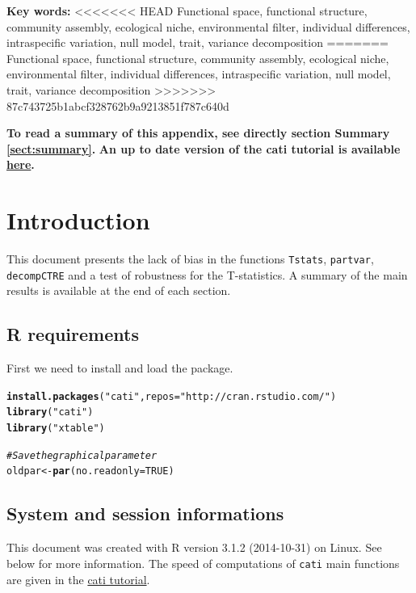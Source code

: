 \documentclass[12pt]{article}\usepackage[]{graphicx}\usepackage[]{color}
\makeatletter
\newcommand{\hlnum}[1]{\textcolor[rgb]{0.686,0.059,0.569}{#1}}%
\newcommand{\hlstr}[1]{\textcolor[rgb]{0.192,0.494,0.8}{#1}}%
\newcommand{\hlcom}[1]{\textcolor[rgb]{0.678,0.584,0.686}{\textit{#1}}}%
\newcommand{\hlstd}[1]{\textcolor[rgb]{0.345,0.345,0.345}{#1}}%
\newcommand{\hlkwb}[1]{\textcolor[rgb]{0.69,0.353,0.396}{#1}}%
\newcommand{\hlkwc}[1]{\textcolor[rgb]{0.333,0.667,0.333}{#1}}%
\newcommand{\hlkwd}[1]{\textcolor[rgb]{0.737,0.353,0.396}{\textbf{#1}}}%
\newenvironment{kframe}{%
 \def\at@end@of@kframe{}%
 \ifinner\ifhmode%
  \def\at@end@of@kframe{\end{minipage}}%
  \begin{minipage}{\columnwidth}%
 \fi\fi%
 \def\FrameCommand##1{\hskip\@totalleftmargin \hskip-\fboxsep
 \colorbox{shadecolor}{##1}\hskip-\fboxsep
     \hskip-\linewidth \hskip-\@totalleftmargin \hskip\columnwidth}%
 \MakeFramed {\advance\hsize-\width
   \@totalleftmargin\z@ \linewidth\hsize
   \@setminipage}}%
 {\par\unskip\endMakeFramed%
 \at@end@of@kframe}
\newenvironment{knitrout}{}{} %
\makeatother
\begin{document}
\textbf{Key words:}
<<<<<<< HEAD
Functional space, functional structure, community assembly, ecological niche, environmental filter, individual differences, intraspecific variation, null model, trait, variance decomposition
=======
Functional space, functional structure, community assembly, ecological niche, environmental filter,
individual differences, intraspecific variation, null model, trait, variance decomposition
>>>>>>> 87c743725b1abcf328762b9a9213851f787c640d


\vfill
\begin{center}
\textbf{To read a summary of this appendix, see directly section Summary \ref{sect:summary}.}
\textbf{An up to date version of the cati tutorial is available \href{https://github.com/adrientaudiere/cati/blob/Package-cati/Documentation/vignette_Darwin_finches/vignette.pdf}{here}.}
\end{center}

\newpage
\tableofcontents
\newpage


\section{Introduction}
 This document presents the lack of bias in the functions \texttt{Tstats}, \texttt{partvar}, \texttt{decompCTRE} and a test of robustness for the T-statistics. A summary of the main results is available at the end of each section.

\subsection{R requirements}

First we need to install and load the package. 
\begin{knitrout}\small
{}\color{fgcolor}\begin{kframe}
\begin{alltt}
\hlkwd{install.packages}\hlstd{(}\hlstr{"cati"}\hlstd{,} \hlkwc{repos} \hlstd{=} \hlstr{"http://cran.rstudio.com/"}\hlstd{)}
\hlkwd{library}\hlstd{(}\hlstr{"cati"}\hlstd{)}
\hlkwd{library}\hlstd{(}\hlstr{"xtable"}\hlstd{)}

\hlcom{# Save the graphical parameter}
\hlstd{oldpar} \hlkwb{<-} \hlkwd{par}\hlstd{(}\hlkwc{no.readonly} \hlstd{=} \hlnum{TRUE}\hlstd{)}
\end{alltt}
\end{kframe}
\end{knitrout}

  \subsection{System and session informations}
  This document was created with R version 3.1.2 (2014-10-31) on Linux. See below for more information. The speed of computations of \texttt{cati} main functions are given  in the \href{https://github.com/adrientaudiere/cati/blob/Package-cati/Documentation/vignette_Darwin_finches/vignette.pdf}{cati tutorial}.
  
\end{document}
